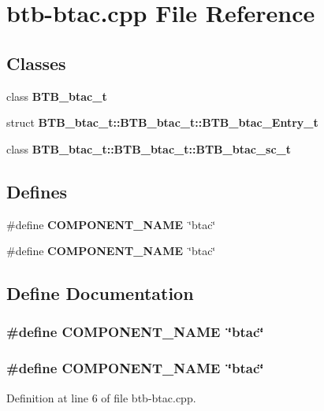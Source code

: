 \section{btb-btac.cpp File Reference}
\label{btb-btac_8cpp}
\subsection*{Classes}
\begin{CompactItemize}
\item 
class {\bf BTB\_\-btac\_\-t}
\item 
struct {\bf BTB\_\-btac\_\-t::BTB\_\-btac\_\-t::BTB\_\-btac\_\-Entry\_\-t}
\item 
class {\bf BTB\_\-btac\_\-t::BTB\_\-btac\_\-t::BTB\_\-btac\_\-sc\_\-t}
\end{CompactItemize}
\subsection*{Defines}
\begin{CompactItemize}
\item 
\#define {\bf COMPONENT\_\-NAME}~\char`\"{}btac\char`\"{}
\item 
\#define {\bf COMPONENT\_\-NAME}~\char`\"{}btac\char`\"{}
\end{CompactItemize}


\subsection{Define Documentation}
\subsubsection[{COMPONENT\_\-NAME}]{\setlength{\rightskip}{0pt plus 5cm}\#define COMPONENT\_\-NAME~\char`\"{}btac\char`\"{}}\label{zesto-bpred_8cpp_9146ade7ce24e3db226a973a59063892}


\subsubsection[{COMPONENT\_\-NAME}]{\setlength{\rightskip}{0pt plus 5cm}\#define COMPONENT\_\-NAME~\char`\"{}btac\char`\"{}}\label{btb-btac_8cpp_9146ade7ce24e3db226a973a59063892}




Definition at line 6 of file btb-btac.cpp.